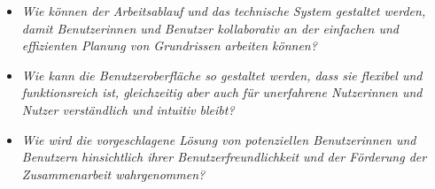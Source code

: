 \begin{itemize}
  \item \textit{Wie können der Arbeitsablauf und das technische System gestaltet werden, damit Benutzerinnen und Benutzer kollaborativ an der einfachen und effizienten Planung von Grundrissen arbeiten können?}
  \item \textit{Wie kann die Benutzeroberfläche so gestaltet werden, dass sie flexibel und funktionsreich ist, gleichzeitig aber auch für unerfahrene Nutzerinnen und Nutzer verständlich und intuitiv bleibt?}
  \item \textit{Wie wird die vorgeschlagene Lösung von potenziellen Benutzerinnen und Benutzern hinsichtlich ihrer Benutzerfreundlichkeit und der Förderung der Zusammenarbeit wahrgenommen?}
\end{itemize}
